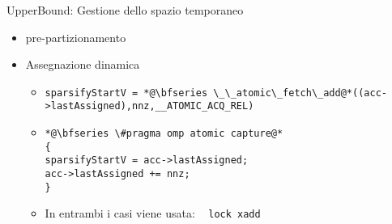 \begin{frame}[fragile] {UpperBound: Gestione dello spazio temporaneo}
\begin{itemize}
	\item	pre-partizionamento
	\item	Assegnazione dinamica
	\begin{itemize}
		\item	\begin{lstlisting}[basicstyle=\tiny,numbers=none]
sparsifyStartV = *@\bfseries \_\_atomic\_fetch\_add@*((acc->lastAssigned),nnz,__ATOMIC_ACQ_REL)
		\end{lstlisting}

		\item	\begin{lstlisting}[basicstyle=\tiny,numbers=none]
*@\bfseries \#pragma omp atomic capture@*
{ 
sparsifyStartV = acc->lastAssigned;
acc->lastAssigned += nnz;
}
		\end{lstlisting}
		\item In entrambi i casi viene usata:   \verb|lock xadd|
	\end{itemize}
\end{itemize}
%
%
\end{frame}

